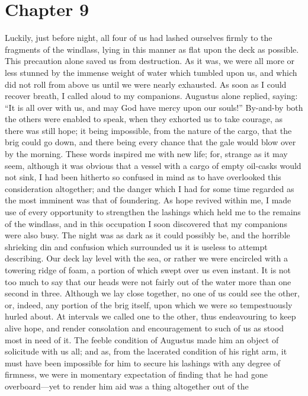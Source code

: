 \section{Chapter 9}
Luckily, just before night, all four of us had lashed ourselves firmly
to the fragments of the windlass, lying in this manner as flat upon the deck as
possible. This precaution alone saved us from destruction. As it was, we were
all more or less stunned by the immense weight of water which tumbled upon us,
and which did not roll from above us until we were nearly exhausted. As soon as
I could recover breath, I called aloud to my companions. Augustus alone replied,
saying: ``It is all over with us, and may God have mercy upon our souls!''
By-and-by both the others were enabled to speak, when they exhorted us to take
courage, as there was still hope; it being impossible, from the nature of the
cargo, that the brig could go down, and there being every chance that the gale
would blow over by the morning. These words inspired me with new life; for,
strange as it may seem, although it was obvious that a vessel with a cargo of
empty oil-casks would not sink, I had been hitherto so confused in mind as to
have overlooked this consideration altogether; and the danger which I had for
some time regarded as the most imminent was that of foundering. As hope revived
within me, I made use of every opportunity to strengthen the lashings which held
me to the remains of the windlass, and in this occupation I soon discovered that
my companions were also busy. The night was as dark as it could possibly be, and
the horrible shrieking din and confusion which surrounded us it is useless to
attempt describing. Our deck lay level with the sea, or rather we were encircled
with a towering ridge of foam, a portion of which swept over us even instant. It
is not too much to say that our heads were not fairly out of the water more than
one second in three. Although we lay close together, no one of us could see the
other, or, indeed, any portion of the brig itself, upon which we were so
tempestuously hurled about. At intervals we called one to the other, thus
endeavouring to keep alive hope, and render consolation and encouragement to
such of us as stood most in need of it. The feeble condition of Augustus made
him an object of solicitude with us all; and as, from the lacerated condition of
his right arm, it must have been impossible for him to secure his lashings with
any degree of firmness, we were in momentary expectation of finding that he had
gone overboard---yet to render him aid was a thing altogether out of the
